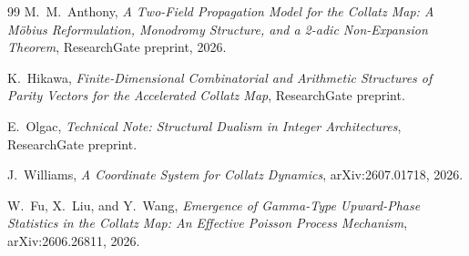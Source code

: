 \documentclass[11pt]{article}
\begin{document}
\begin{thebibliography}{99}
 M.\ M.\ Anthony, \emph{A Two-Field Propagation
  Model for the Collatz Map: A Möbius Reformulation, Monodromy
  Structure, and a 2-adic Non-Expansion Theorem}, ResearchGate
  preprint, 2026.

 K.\ Hikawa, \emph{Finite-Dimensional Combinatorial
  and Arithmetic Structures of Parity Vectors for the Accelerated
  Collatz Map}, ResearchGate preprint.

 E.\ Olgac, \emph{Technical Note: Structural Dualism
  in Integer Architectures}, ResearchGate preprint.

 J.\ Williams, \emph{A Coordinate System for
  Collatz Dynamics}, arXiv:2607.01718, 2026.

 W.\ Fu, X.\ Liu, and Y.\ Wang, \emph{Emergence of
  Gamma-Type Upward-Phase Statistics in the Collatz Map: An Effective
  Poisson Process Mechanism}, arXiv:2606.26811, 2026.

\end{thebibliography}
\end{document}
